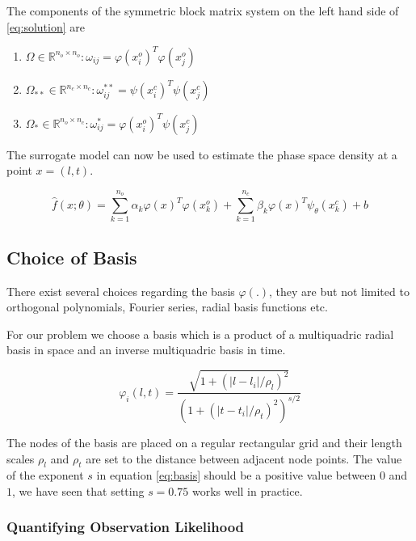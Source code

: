 \documentclass{article}
\begin{document}
The components of the symmetric block matrix system on the left hand side of 
\ref{eq:solution} are 
\begin{enumerate}
\item $\Omega \in \mathbb{R}^{n_{o} \times n_{o}}: \omega_{ij} = \varphi(x^{o}_{i})^{T} \varphi(x^{o}_{j})$
\item $\Omega_{**} \in \mathbb{R}^{n_{c} \times n_{c}}: \omega^{**}_{ij} = \psi(x^{c}_{i})^{T} \psi(x^{c}_{j})$
\item $\Omega_{*} \in \mathbb{R}^{n_{o} \times n_{c}}: \omega^{*}_{ij} = \varphi(x^{o}_{i})^{T} \psi(x^{c}_{j})$
\end{enumerate}

The surrogate model can now be used to estimate the phase space density 
at a point $x = (l,t)$.

\begin{equation}\label{eq:model}
\hat{f}(x;\theta) = \sum_{k = 1}^{n_{o}}{\alpha_{k}\varphi(x)^{T}\varphi(x^{o}_{k}) + \sum_{k = 1}^{n_{c}}}{\beta_{k} \varphi(x)^{T} \psi_{\theta}(x^{c}_{k})} + b
\end{equation}

\subsection*{Choice of Basis}

There exist several choices regarding the basis $\varphi(.)$, they are but not limited to 
orthogonal polynomials, Fourier series, radial basis functions etc. 

For our problem we choose a basis which is a product of a multiquadric radial basis in space and 
an inverse multiquadric basis in time.

\begin{equation}\label{eq:basis}
\varphi_{i}(l,t) = \frac{\sqrt{1+(|l - l_{i}|/\rho_{l})^{2}}}{(1+(|t - t_{i}|/\rho_{t})^{2})^{s/2}}
\end{equation}

The nodes of the basis are placed on a regular rectangular grid and their 
length scales $\rho_l$ and $\rho_t$ are set to the distance between adjacent
node points. The value of the exponent $s$ in equation \ref{eq:basis} should be
a positive value between $0$ and $1$, we have seen that setting $s = 0.75$ works well
in practice.

\subsubsection*{Quantifying Observation Likelihood}
\end{document}
